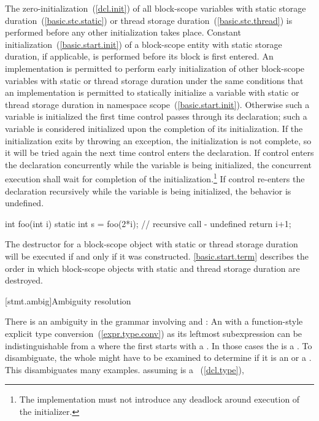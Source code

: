 \pnum
{}%
%
The zero-initialization~(\ref{dcl.init}) of all block-scope
variables with
static storage duration~(\ref{basic.stc.static}) or thread storage duration~(\ref{basic.stc.thread}) is performed before any
other initialization takes place. Constant initialization~(\ref{basic.start.init}) of a
block-scope entity with static storage duration, if applicable, is performed before its block is first
entered. An implementation is permitted to perform early initialization
of other block-scope variables with static or thread storage duration under the same
conditions that an implementation is permitted to statically initialize
a variable with static or thread storage duration in namespace
scope~(\ref{basic.start.init}). Otherwise such a variable is initialized
the first time control passes through its declaration; such a variable is
considered initialized upon the completion of its initialization. If the
initialization exits by throwing an exception, the initialization is not
complete, so it will be tried again the next time control enters the
declaration. If control enters the declaration concurrently while the variable is being initialized, the concurrent execution shall wait for completion of the initialization.\footnote{The implementation must not introduce any deadlock around execution of the initializer.} If control re-enters the declaration recursively while
the variable is being initialized, the behavior is undefined.
\enterexample

\begin{codeblock}
int foo(int i) {
  static int s = foo(2*i);      // recursive call - undefined
  return i+1;
}
\end{codeblock}
\exitexample

\pnum
{}%
The destructor for a block-scope object with static or thread storage duration will be
executed if and only if it was constructed.
\enternote
\ref{basic.start.term} describes the order in which block-scope objects with
static and thread storage duration are destroyed.
\exitnote

[stmt.ambig]{Ambiguity resolution}%

\pnum
There is an ambiguity in the grammar involving
 and : An
 with a function-style explicit type
conversion~(\ref{expr.type.conv}) as its leftmost subexpression can be
indistinguishable from a  where the first
 starts with a \tcode{(}. In those cases the
 is a . \enternote To
disambiguate, the whole  might have to be examined
to determine if it is an  or a
. This disambiguates many examples.
\enterexample
assuming  is a
~(\ref{dcl.type}),

